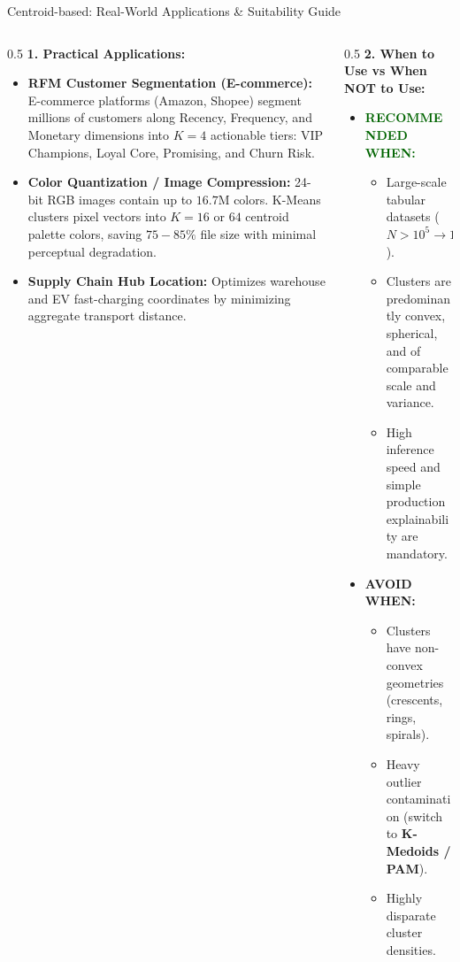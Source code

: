 \documentclass[aspectratio=169,10pt]{beamer}
\begin{document}
\begin{frame}{Centroid-based: Real-World Applications \& Suitability Guide}
  \small
  \begin{columns}[T]
    \begin{column}{0.5\textwidth}
      \textbf{1. Practical Applications:}
      \begin{itemize}\setlength{\itemsep}{2pt}
        \item \textbf{RFM Customer Segmentation (E-commerce):}
          E-commerce platforms (Amazon, Shopee) segment millions of customers along Recency, Frequency, and Monetary dimensions into $K=4$ actionable tiers: VIP Champions, Loyal Core, Promising, and Churn Risk.
        \item \textbf{Color Quantization / Image Compression:}
          24-bit RGB images contain up to $16.7$M colors. K-Means clusters pixel vectors into $K=16$ or $64$ centroid palette colors, saving $75-85\%$ file size with minimal perceptual degradation.
        \item \textbf{Supply Chain Hub Location:}
          Optimizes warehouse and EV fast-charging coordinates by minimizing aggregate transport distance.
      \end{itemize}
    \end{column}
    \begin{column}{0.5\textwidth}
      \textbf{2. When to Use vs When NOT to Use:}
      \begin{itemize}\setlength{\itemsep}{2pt}
        \item \textcolor{darkgreen}{\textbf{RECOMMENDED WHEN:}}
          \begin{itemize}
            \item Large-scale tabular datasets ($N > 10^5 \to 10^7$).
            \item Clusters are predominantly convex, spherical, and of comparable scale and variance.
            \item High inference speed and simple production explainability are mandatory.
          \end{itemize}
        \item \textcolor{crimsonred}{\textbf{AVOID WHEN:}}
          \begin{itemize}
            \item Clusters have non-convex geometries (crescents, rings, spirals).
            \item Heavy outlier contamination (switch to \textbf{K-Medoids / PAM}).
            \item Highly disparate cluster densities.
          \end{itemize}
      \end{itemize}
    \end{column}
  \end{columns}
\end{frame}
\end{document}

